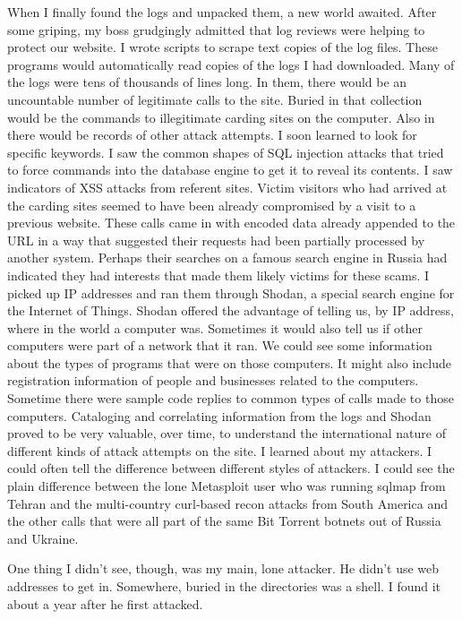 When I finally found the logs and unpacked them, a new world awaited.  After some griping, my boss grudgingly admitted that log reviews were helping to protect our website.  I wrote scripts to scrape text copies of the log files.  These programs would automatically read copies of the logs I had downloaded.  Many of the logs were tens of thousands of lines long.  In them, there would be an uncountable number of legitimate calls to the site.  Buried in that collection would be the commands to illegitimate carding sites on the computer.  Also in there would be records of other \gls{attack} attempts.  I soon learned to look for specific keywords.  I saw the common shapes of SQL injection attacks that tried to force commands into the database engine to get it to reveal its contents.  I saw indicators of XSS attacks from referent sites.  Victim visitors who had arrived at the carding sites seemed to have been already compromised by a visit to a previous website.  These calls came in with encoded data already appended to the URL in a way that suggested their requests had been partially processed by another system.  Perhaps their searches on a famous search engine in Russia had indicated they had interests that made them likely victims for these scams.  I picked up IP addresses and ran them through Shodan, a special search engine for the Internet of Things.  Shodan offered the advantage of telling us, by IP address, where in the world a computer was.  Sometimes it would also tell us if other computers were part of a network that it ran.  We could see some information about the types of programs that were on those computers.  It might also include registration information of people and businesses related to the computers.  Sometime there were sample code replies to common types of calls made to those computers.  Cataloging and correlating information from the logs and Shodan proved to be very valuable, over time, to understand the international nature of different kinds of \gls{attack} attempts on the site.  I learned about my attackers.  I could often tell the difference between different styles of attackers.  I could see the plain difference between the lone Metasploit user who was running sqlmap from Tehran and the multi-country curl-based recon attacks from South America and the other calls that were all part of the same Bit Torrent botnets out of Russia and Ukraine.

One thing I didn't see, though, was my main, lone attacker.  He didn't use web addresses to get in.  Somewhere, buried in the directories was a shell.  I found it about a year after he first attacked.

